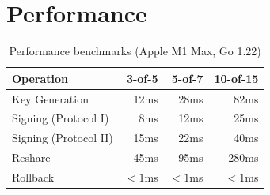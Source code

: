 \section{Performance}


\begin{table}[h]
\centering
\small
\begin{tabular}{lrrr}
\toprule
\textbf{Operation} & \textbf{3-of-5} & \textbf{5-of-7} & \textbf{10-of-15} \\
\midrule
Key Generation & 12ms & 28ms & 82ms \\
Signing (Protocol I) & 8ms & 12ms & 25ms \\
Signing (Protocol II) & 15ms & 22ms & 40ms \\
Reshare & 45ms & 95ms & 280ms \\
Rollback & $< 1$ms & $< 1$ms & $< 1$ms \\
\bottomrule
\end{tabular}
\caption{Performance benchmarks (Apple M1 Max, Go 1.22)}
\label{tab:perf}
\end{table}

